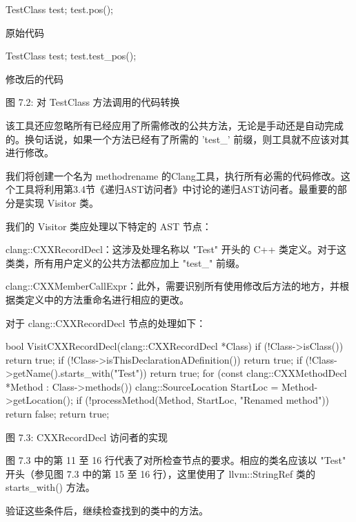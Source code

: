 \begin{cpp}
TestClass test;
test.pos();
\end{cpp}

原始代码

\begin{cpp}
TestClass test;
test.test_pos();
\end{cpp}

修改后的代码

\begin{center}
图 7.2: 对 TestClass 方法调用的代码转换
\end{center}

该工具还应忽略所有已经应用了所需修改的公共方法，无论是手动还是自动完成的。换句话说，如果一个方法已经有了所需的 'test\_' 前缀，则工具就不应该对其进行修改。

我们将创建一个名为 methodrename 的Clang工具，执行所有必需的代码修改。这个工具将利用第3.4节《递归AST访问者》中讨论的递归AST访问者。最重要的部分是实现 Visitor 类。


我们的 Visitor 类应处理以下特定的 AST 节点：

clang::CXXRecordDecl：这涉及处理名称以 "Test" 开头的 C++ 类定义。对于这类类，所有用户定义的公共方法都应加上 "test\_" 前缀。

clang::CXXMemberCallExpr：此外，需要识别所有使用修改后方法的地方，并根据类定义中的方法重命名进行相应的更改。

对于 clang::CXXRecordDecl 节点的处理如下：

\begin{cpp}
bool VisitCXXRecordDecl(clang::CXXRecordDecl *Class) {
  if (!Class->isClass())
    return true;
  if (!Class->isThisDeclarationADefinition())
    return true;
  if (!Class->getName().starts_with("Test"))
    return true;
  for (const clang::CXXMethodDecl *Method : Class->methods()) {
    clang::SourceLocation StartLoc = Method->getLocation();
    if (!processMethod(Method, StartLoc, "Renamed method"))
      return false;
  }
  return true;
}
\end{cpp}

\begin{center}
图 7.3: CXXRecordDecl 访问者的实现
\end{center}

图 7.3 中的第 11 至 16 行代表了对所检查节点的要求。相应的类名应该以 "Test" 开头（参见图 7.3 中的第 15 至 16 行），这里使用了 llvm::StringRef 类的 starts\_with() 方法。

验证这些条件后，继续检查找到的类中的方法。


